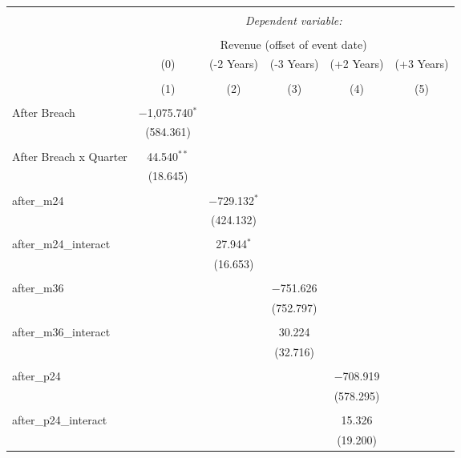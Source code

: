 
\begin{table}[!htbp] \centering 
  \caption{} 
  \label{} 
\begin{tabular}{@{\extracolsep{5pt}}lccccc} 
\\[-1.8ex]\hline 
\hline \\[-1.8ex] 
 & \multicolumn{5}{c}{\textit{Dependent variable:}} \\ 
\cline{2-6} 
\\[-1.8ex] & \multicolumn{5}{c}{Revenue (offset of event date)} \\ 
 & (0) & (-2 Years) & (-3 Years) & (+2 Years) & (+3 Years) \\ 
\\[-1.8ex] & (1) & (2) & (3) & (4) & (5)\\ 
\hline \\[-1.8ex] 
 After Breach & $-$1,075.740$^{*}$ &  &  &  &  \\ 
  & (584.361) &  &  &  &  \\ 
  & & & & & \\ 
 After Breach x Quarter & 44.540$^{**}$ &  &  &  &  \\ 
  & (18.645) &  &  &  &  \\ 
  & & & & & \\ 
 after\_m24 &  & $-$729.132$^{*}$ &  &  &  \\ 
  &  & (424.132) &  &  &  \\ 
  & & & & & \\ 
 after\_m24\_interact &  & 27.944$^{*}$ &  &  &  \\ 
  &  & (16.653) &  &  &  \\ 
  & & & & & \\ 
 after\_m36 &  &  & $-$751.626 &  &  \\ 
  &  &  & (752.797) &  &  \\ 
  & & & & & \\ 
 after\_m36\_interact &  &  & 30.224 &  &  \\ 
  &  &  & (32.716) &  &  \\ 
  & & & & & \\ 
 after\_p24 &  &  &  & $-$708.919 &  \\ 
  &  &  &  & (578.295) &  \\ 
  & & & & & \\ 
 after\_p24\_interact &  &  &  & 15.326 &  \\ 
  &  &  &  & (19.200) &  \\ 

\end{tabular}
\end{table}
